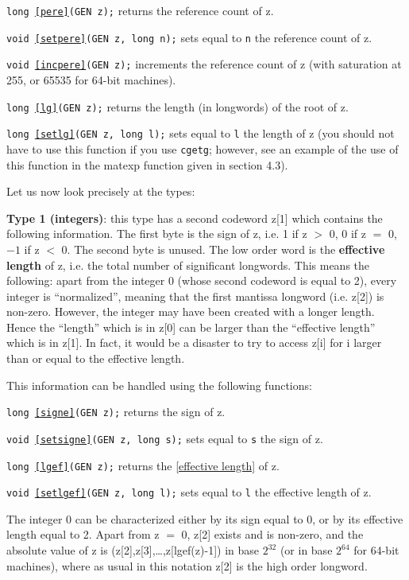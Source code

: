 {\tt long \ref{pere}(GEN z);} returns the reference count of z.

{\tt void \ref{setpere}(GEN z, long n);} sets equal to {\tt n} the reference count of z.

{\tt void \ref{incpere}(GEN z);} increments the reference count of z
(with saturation at 255, or 65535 for 64-bit machines).

{\tt long \ref{lg}(GEN z);} returns the length (in longwords) of the root of z.

{\tt long \ref{setlg}(GEN z, long l);} sets equal to {\tt l} the length of z 
(you should not have to use this function if you use {\tt cgetg}; however,
see an example of the use of this function in the matexp function given in 
section 4.3).

Let us now look precisely at the types:

{\bf Type 1 (integers)}: 
this type has a second codeword z[1] which contains the
following information. The first byte is the sign of z, i.e. 1 if z $>$ 0,
0 if z $=$ 0, $-1$ if z $<$ 0. The second byte is unused. The low order word is
the {\bf effective length} of z, i.e. the total number of significant longwords.
This means the following: apart from the integer 0 (whose second codeword is
equal to 2), every integer is ``normalized'', meaning that the first
mantissa longword (i.e. z[2]) is non-zero. However, the integer may have been
created with a longer length. Hence the ``length'' which is in z[0] can
be larger than the ``effective length'' which is in z[1]. In fact, it would be
a disaster to try to access z[i] for i larger than or equal to the effective length.

This information can be handled using the following functions:

{\tt long \ref{signe}(GEN z);} returns the sign of z.

{\tt void \ref{setsigne}(GEN z, long s);} sets equal to {\tt s} the sign of z.

{\tt long \ref{lgef}(GEN z);} returns the \ref{effective length} of z.

{\tt void \ref{setlgef}(GEN z, long l);} sets equal to {\tt l} the effective length of z.

The integer 0 can be characterized either by its sign equal to 0, or by
its effective length equal to 2. Apart from z $=$ 0, z[2] exists and is non-zero,
and the absolute value of z is (z[2],z[3],\dots,z[lgef(z)-1]) in base $2^{32}$
(or in base $2^{64}$ for 64-bit machines), where as usual in this notation z[2] is the high order longword.

